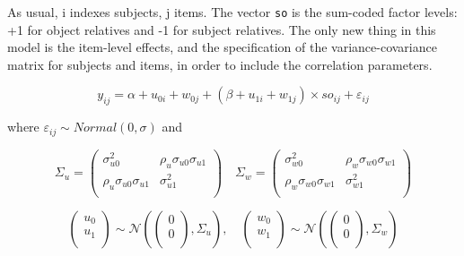 \documentclass[12pt,]{krantz}
\begin{document}
As usual, i indexes subjects, j items. The vector \texttt{so} is the sum-coded factor levels: +1 for object relatives and -1 for subject relatives. The only new thing in this model is the item-level effects, and the specification of the variance-covariance matrix for subjects and items, in order to include the correlation parameters.

\begin{equation}
y_{ij} = \alpha + u_{0i} + w_{0j} + (\beta + u_{1i} + w_{1j}) \times so_{ij} + \varepsilon_{ij}
\end{equation}

where \(\varepsilon_{ij} \sim Normal(0,\sigma)\) and

\begin{equation}\label{eq:covmatLM}
\Sigma_u
=
\begin{pmatrix}
\sigma _{u0}^2  & \rho _{u}\sigma _{u0}\sigma _{u1}\\
\rho _{u}\sigma _{u0}\sigma _{u1}    & \sigma _{u1}^2\\
\end{pmatrix}
\quad 
\Sigma _w
=
\begin{pmatrix}
\sigma _{w0}^2  & \rho _{w}\sigma _{w0}\sigma _{w1}\\
\rho _{w}\sigma _{w0}\sigma _{w1}    & \sigma _{w1}^2\\
\end{pmatrix}
\end{equation}

\begin{equation}\label{eq:jointpriordistLM}
\begin{pmatrix}
  u_0 \\ 
  u_1 \\
\end{pmatrix}
\sim 
\mathcal{N} \left(
\begin{pmatrix}
  0 \\
  0 \\
\end{pmatrix},
\Sigma_{u}
\right),
\quad
\begin{pmatrix}
  w_0 \\ 
  w_1 \\
\end{pmatrix}
\sim 
\mathcal{N}\left(
\begin{pmatrix}
  0 \\
  0 \\
\end{pmatrix},
\Sigma_{w}
\right)
\end{equation}
\end{document}
